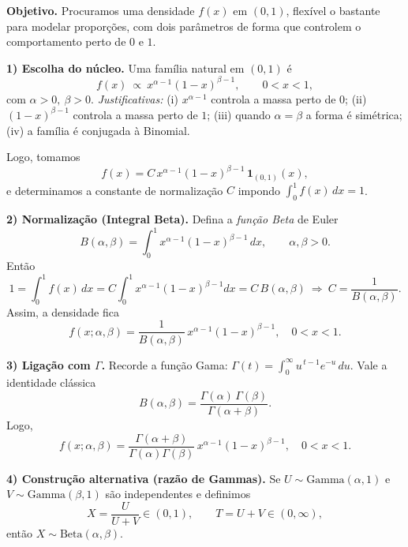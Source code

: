 


\textbf{Objetivo.} Procuramos uma densidade $f(x)$ em $(0,1)$, flexível o bastante
para modelar proporções, com dois parâmetros de forma que controlem o
comportamento perto de $0$ e $1$.

\textbf{1) Escolha do núcleo.}
Uma família natural em $(0,1)$ é
\[
f(x)\ \propto\ x^{\alpha-1}(1-x)^{\beta-1},\qquad 0<x<1,
\]
com $\alpha>0,\ \beta>0$.
\emph{Justificativas:}
(i) $x^{\alpha-1}$ controla a massa perto de $0$; 
(ii) $(1-x)^{\beta-1}$ controla a massa perto de $1$; 
(iii) quando $\alpha=\beta$ a forma é simétrica;
(iv) a família é conjugada à Binomial.

Logo, tomamos
\[
f(x)=C\,x^{\alpha-1}(1-x)^{\beta-1}\,\mathbf 1_{(0,1)}(x),
\]
e determinamos a constante de normalização $C$ impondo $\int_0^1 f(x)\,dx=1$.

\textbf{2) Normalização (Integral Beta).}
Defina a \emph{função Beta} de Euler
\[
B(\alpha,\beta)=\int_0^1 x^{\alpha-1}(1-x)^{\beta-1}\,dx,\qquad \alpha,\beta>0.
\]
Então
\[
1=\int_0^1 f(x)\,dx=C\int_0^1 x^{\alpha-1}(1-x)^{\beta-1}dx=C\,B(\alpha,\beta)
\ \Longrightarrow\ 
C=\frac{1}{B(\alpha,\beta)}.
\]
Assim, a densidade fica
\[
\boxed{\,f(x;\alpha,\beta)=\frac{1}{B(\alpha,\beta)}\,x^{\alpha-1}(1-x)^{\beta-1},\quad 0<x<1.\,}
\]

\textbf{3) Ligação com $\Gamma$.}
Recorde a função Gama: $\displaystyle \Gamma(t)=\int_0^\infty u^{\,t-1}e^{-u}\,du$.
Vale a identidade clássica
\[
B(\alpha,\beta)=\frac{\Gamma(\alpha)\,\Gamma(\beta)}{\Gamma(\alpha+\beta)}.
\]
Logo,
\[
\boxed{\,f(x;\alpha,\beta)
=\frac{\Gamma(\alpha+\beta)}{\Gamma(\alpha)\Gamma(\beta)}\,
x^{\alpha-1}(1-x)^{\beta-1},\quad 0<x<1.\,}
\]

\textbf{4) Construção alternativa (razão de Gammas).}
Se $U\sim\mathrm{Gamma}(\alpha,1)$ e $V\sim\mathrm{Gamma}(\beta,1)$ são independentes
e definimos
\[
X=\frac{U}{U+V}\in(0,1),\qquad T=U+V\in(0,\infty),
\]
então $X\sim\mathrm{Beta}(\alpha,\beta)$.

